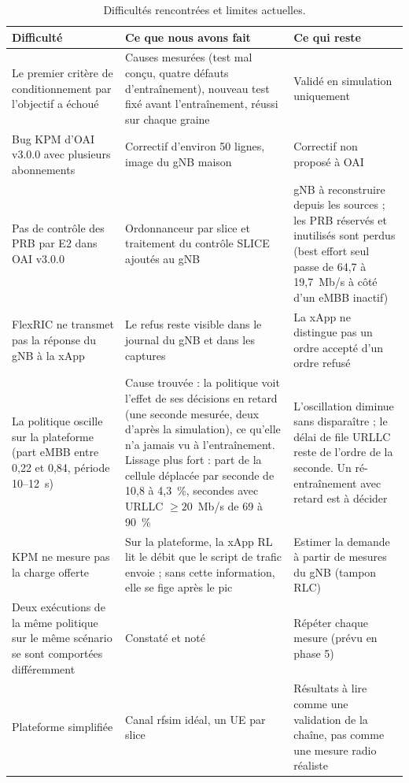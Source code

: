 \documentclass[11pt,a4paper]{article}
\begin{document}
\begin{table}[H]
\centering\small
\begin{tabularx}{\textwidth}{@{}P{4.2cm}LL@{}}
\toprule
Difficulté & Ce que nous avons fait & Ce qui reste\\
\midrule
Le premier critère de conditionnement par l'objectif a échoué & Causes mesurées (test mal conçu, quatre défauts d'entraînement), nouveau test fixé avant l'entraînement, réussi sur chaque graine & Validé en simulation uniquement\\
Bug KPM d'OAI v3.0.0 avec plusieurs abonnements & Correctif d'environ 50 lignes, image du gNB maison & Correctif non proposé à OAI\\
Pas de contrôle des PRB par E2 dans OAI v3.0.0 & Ordonnanceur par slice et traitement du contrôle SLICE ajoutés au gNB & gNB à reconstruire depuis les sources ; les PRB réservés et inutilisés sont perdus (best effort seul passe de 64,7 à 19,7~Mb/s à côté d'un eMBB inactif)\\
FlexRIC ne transmet pas la réponse du gNB à la xApp & Le refus reste visible dans le journal du gNB et dans les captures & La xApp ne distingue pas un ordre accepté d'un ordre refusé\\
La politique oscille sur la plateforme (part eMBB entre 0,22 et 0,84, période 10--12~s) & Cause trouvée : la politique voit l'effet de ses décisions en retard (une seconde mesurée, deux d'après la simulation), ce qu'elle n'a jamais vu à l'entraînement. Lissage plus fort : part de la cellule déplacée par seconde de 10,8 à 4,3~\%, secondes avec URLLC $\geq 20$~Mb/s de 69 à 90~\% & L'oscillation diminue sans disparaître ; le délai de file URLLC reste de l'ordre de la seconde. Un ré-entraînement avec retard est à décider\\
KPM ne mesure pas la charge offerte & Sur la plateforme, la xApp RL lit le débit que le script de trafic envoie ; sans cette information, elle se fige après le pic & Estimer la demande à partir de mesures du gNB (tampon RLC)\\
Deux exécutions de la même politique sur le même scénario se sont comportées différemment & Constaté et noté & Répéter chaque mesure (prévu en phase 5)\\
Plateforme simplifiée & Canal rfsim idéal, un UE par slice & Résultats à lire comme une validation de la chaîne, pas comme une mesure radio réaliste\\
\bottomrule
\end{tabularx}
\caption{Difficultés rencontrées et limites actuelles.}
\end{table}
\end{document}
